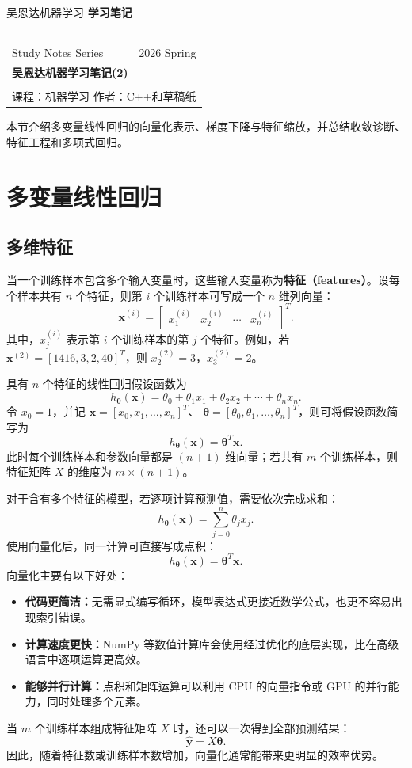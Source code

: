 \documentclass[12pt,a4paper]{ctexart}
\newcommand{\topbar}[2]{
  \noindent
  {\small\textcolor{MainColor}{#1}}
  \hfill
  {\small\bfseries\textcolor{TitleDark}{#2}}
  \par\vspace{0.35em}
  {\color{BorderGray}\hrule}
  \vspace{1.2em}
}
\newcommand{\notetitlecard}[6]{
\begin{tcolorbox}[
  enhanced,
  colback=white,
  colframe=BorderGray,
  boxrule=0.6pt,
  arc=2mm,
  left=12pt,
  right=12pt,
  top=10pt,
  bottom=10pt,
  borderline west={4pt}{0pt}{SecondColor}
]
\begin{tabularx}{\linewidth}{X r}
{\small\textcolor{TextGray}{#1}} & {\small\textcolor{TextGray}{#2}} \\[0.9em]
\multicolumn{2}{l}{
  {\Huge\bfseries\textcolor{MainColor}{#3}}
} \\[0.45em]
\multicolumn{2}{l}{
  {\large\textcolor{SecondColor!90!black}{#4}}
} \\[0.45em]
\multicolumn{2}{l}{
  {\small\textcolor{TextGray}{课程：#5 \qquad 作者：#6}}
}
\end{tabularx}
\end{tcolorbox}
\vspace{1em}
}
\newcommand{\concept}[1]{\textbf{\textcolor{DefineColor}{#1}}}
\begin{document}
\topbar{吴恩达机器学习}{学习笔记}

\notetitlecard
  {Study Notes Series}
  {2026 Spring}
  {吴恩达机器学习笔记(2)}
  {}
  {机器学习}
  {C++和草稿纸}

\begin{summarybox}
本节介绍多变量线性回归的向量化表示、梯度下降与特征缩放，并总结收敛诊断、特征工程和多项式回归。
\end{summarybox}
\section{多变量线性回归}

\subsection{多维特征}

\begin{definitionbox}[多维特征的符号表示]
当一个训练样本包含多个输入变量时，这些输入变量称为\concept{特征（features）}。设每个样本共有 $n$ 个特征，则第 $i$ 个训练样本可写成一个 $n$ 维列向量：
\[
  \mathbf{x}^{(i)}=
  \begin{bmatrix}
    x_1^{(i)} & x_2^{(i)} & \cdots & x_n^{(i)}
  \end{bmatrix}^{T}.
\]
其中，$x_j^{(i)}$ 表示第 $i$ 个训练样本的第 $j$ 个特征。例如，若
$\mathbf{x}^{(2)}=[1416,3,2,40]^T$，则 $x_2^{(2)}=3$，$x_3^{(2)}=2$。

具有 $n$ 个特征的线性回归假设函数为
\[
  h_{\boldsymbol{\theta}}(\mathbf{x})
  =\theta_0+\theta_1x_1+\theta_2x_2+\cdots+\theta_nx_n.
\]
令 $x_0=1$，并记
$\mathbf{x}=[x_0,x_1,\ldots,x_n]^T$、
$\boldsymbol{\theta}=[\theta_0,\theta_1,\ldots,\theta_n]^T$，则可将假设函数简写为
\[
  h_{\boldsymbol{\theta}}(\mathbf{x})=\boldsymbol{\theta}^{T}\mathbf{x}.
\]
此时每个训练样本和参数向量都是 $(n+1)$ 维向量；若共有 $m$ 个训练样本，则特征矩阵 $X$ 的维度为 $m\times(n+1)$。
\end{definitionbox}

\begin{keybox}[向量化的好处]
对于含有多个特征的模型，若逐项计算预测值，需要依次完成求和：
\[
  h_{\boldsymbol{\theta}}(\mathbf{x})
  =\sum_{j=0}^{n}\theta_jx_j.
\]
使用向量化后，同一计算可直接写成点积：
\[
  h_{\boldsymbol{\theta}}(\mathbf{x})
  =\boldsymbol{\theta}^{T}\mathbf{x}.
\]
向量化主要有以下好处：
\begin{itemize}
  \item \textbf{代码更简洁：}无需显式编写循环，模型表达式更接近数学公式，也更不容易出现索引错误。
  \item \textbf{计算速度更快：}NumPy 等数值计算库会使用经过优化的底层实现，比在高级语言中逐项运算更高效。
  \item \textbf{能够并行计算：}点积和矩阵运算可以利用 CPU 的向量指令或 GPU 的并行能力，同时处理多个元素。
\end{itemize}
当 $m$ 个训练样本组成特征矩阵 $X$ 时，还可以一次得到全部预测结果：
\[
  \hat{\mathbf{y}}=X\boldsymbol{\theta}.
\]
因此，随着特征数或训练样本数增加，向量化通常能带来更明显的效率优势。
\end{keybox}
\end{document}
